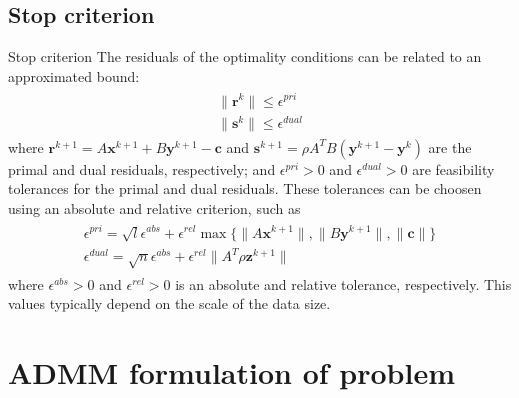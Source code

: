 \documentclass[8pt,red]{beamer}
\theoremstyle{plain}
\theoremstyle{definition}
\theoremstyle{remark}
\newcommand{\bi}[1]{\ensuremath{\boldsymbol{#1}}}
\begin{document}
\subsection{Stop criterion}
\begin{frame}{Stop criterion}
The residuals of the optimality conditions can be related to an approximated bound:
\begin{align}
\begin{array}{l}
  \| \bi{r}^{k} \| \leq \epsilon^{pri} \\
  \| \bi{s}^{k} \| \leq \epsilon^{dual}  
\end{array} \label{eq.stopcriterion}
\end{align}
where $\bi{r}^{k+1} = A \bi{x}^{k+1} + B \bi{y}^{k+1} - \bi{c}$ and $\bi{s}^{k+1} = \rho A^{T} B \left( \bi{y}^{k+1} - \bi{y}^{k} \right)$ are the primal and dual residuals, respectively; and $\epsilon^{pri} > 0$ and $\epsilon^{dual} > 0$ are feasibility tolerances for the primal and dual residuals. These tolerances can be choosen using an absolute and relative criterion, such as
\begin{align}
\begin{array}{l}
  \epsilon^{pri} = \sqrt{l} \epsilon^{abs} + \epsilon^{rel} \max \lbrace \|A \bi{x}^{k+1}\|,\|B \bi{y}^{k+1}\|, \|\bi{c}\|  \rbrace \\
  \epsilon^{dual} = \sqrt{n} \epsilon^{abs} + \epsilon^{rel} \|A^{T} \rho \bi{z}^{k+1}\| 
\end{array}
\end{align}
where $\epsilon^{abs} > 0$ and $\epsilon^{rel} > 0$ is an absolute and relative tolerance, respectively. This values typically depend on the scale of the data size.
\end{frame}

\section{ADMM formulation of problem}
\end{document}

